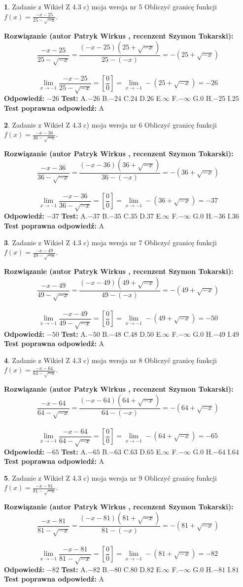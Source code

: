 \documentclass[12pt, a4paper]{article}
\theoremstyle{definition} %
\newtheorem{zad}{}
\newcommand{\zadStart}[1]{\begin{zad}#1\newline}
\newcommand{\zadStop}{\end{zad}}
\newcommand{\rozwStart}[2]{\noindent \textbf{Rozwiązanie (autor #1 , recenzent #2): }\newline}
\newcommand{\rozwStop}{\newline}
\newcommand{\odpStart}{\noindent \textbf{Odpowiedź:}\newline}
\newcommand{\odpStop}{\newline}
\newcommand{\testStart}{\noindent \textbf{Test:}\newline}
\newcommand{\testStop}{\newline}
\newcommand{\kluczStart}{\noindent \textbf{Test poprawna odpowiedź:}\newline}
\newcommand{\kluczStop}{\newline}
\begin{document}
\zadStart{Zadanie z Wikieł Z 4.3 c) moja wersja nr 5}
Obliczyć granicę funkcji $f(x)=\frac{-x-25}{25-\sqrt{-x}}$.
\zadStop
\rozwStart{Patryk Wirkus}{Szymon Tokarski}
$$\frac{-x-25}{25-\sqrt{-x}}=\frac{(-x-25)(25+\sqrt{-x})}{25-(-x)}=-(25+\sqrt{-x})$$
\\
$$\lim\limits_{x\to-1}\frac{-x-25}{25-\sqrt{-x}}=[\frac{0}{0}]=\lim\limits_{x\to-1}-(25+\sqrt{-x}) =-26$$
\rozwStop
\odpStart
$-26$
\odpStop
\testStart
A.$-26$
B.$-24$
C.$24$
D.$26$
E.$\infty$
F.$-\infty$
G.$0$
H.$-25$
I.$25$
\testStop
\kluczStart
A
\kluczStop



\zadStart{Zadanie z Wikieł Z 4.3 c) moja wersja nr 6}
Obliczyć granicę funkcji $f(x)=\frac{-x-36}{36-\sqrt{-x}}$.
\zadStop
\rozwStart{Patryk Wirkus}{Szymon Tokarski}
$$\frac{-x-36}{36-\sqrt{-x}}=\frac{(-x-36)(36+\sqrt{-x})}{36-(-x)}=-(36+\sqrt{-x})$$
\\
$$\lim\limits_{x\to-1}\frac{-x-36}{36-\sqrt{-x}}=[\frac{0}{0}]=\lim\limits_{x\to-1}-(36+\sqrt{-x}) =-37$$
\rozwStop
\odpStart
$-37$
\odpStop
\testStart
A.$-37$
B.$-35$
C.$35$
D.$37$
E.$\infty$
F.$-\infty$
G.$0$
H.$-36$
I.$36$
\testStop
\kluczStart
A
\kluczStop



\zadStart{Zadanie z Wikieł Z 4.3 c) moja wersja nr 7}
Obliczyć granicę funkcji $f(x)=\frac{-x-49}{49-\sqrt{-x}}$.
\zadStop
\rozwStart{Patryk Wirkus}{Szymon Tokarski}
$$\frac{-x-49}{49-\sqrt{-x}}=\frac{(-x-49)(49+\sqrt{-x})}{49-(-x)}=-(49+\sqrt{-x})$$
\\
$$\lim\limits_{x\to-1}\frac{-x-49}{49-\sqrt{-x}}=[\frac{0}{0}]=\lim\limits_{x\to-1}-(49+\sqrt{-x}) =-50$$
\rozwStop
\odpStart
$-50$
\odpStop
\testStart
A.$-50$
B.$-48$
C.$48$
D.$50$
E.$\infty$
F.$-\infty$
G.$0$
H.$-49$
I.$49$
\testStop
\kluczStart
A
\kluczStop



\zadStart{Zadanie z Wikieł Z 4.3 c) moja wersja nr 8}
Obliczyć granicę funkcji $f(x)=\frac{-x-64}{64-\sqrt{-x}}$.
\zadStop
\rozwStart{Patryk Wirkus}{Szymon Tokarski}
$$\frac{-x-64}{64-\sqrt{-x}}=\frac{(-x-64)(64+\sqrt{-x})}{64-(-x)}=-(64+\sqrt{-x})$$
\\
$$\lim\limits_{x\to-1}\frac{-x-64}{64-\sqrt{-x}}=[\frac{0}{0}]=\lim\limits_{x\to-1}-(64+\sqrt{-x}) =-65$$
\rozwStop
\odpStart
$-65$
\odpStop
\testStart
A.$-65$
B.$-63$
C.$63$
D.$65$
E.$\infty$
F.$-\infty$
G.$0$
H.$-64$
I.$64$
\testStop
\kluczStart
A
\kluczStop



\zadStart{Zadanie z Wikieł Z 4.3 c) moja wersja nr 9}
Obliczyć granicę funkcji $f(x)=\frac{-x-81}{81-\sqrt{-x}}$.
\zadStop
\rozwStart{Patryk Wirkus}{Szymon Tokarski}
$$\frac{-x-81}{81-\sqrt{-x}}=\frac{(-x-81)(81+\sqrt{-x})}{81-(-x)}=-(81+\sqrt{-x})$$
\\
$$\lim\limits_{x\to-1}\frac{-x-81}{81-\sqrt{-x}}=[\frac{0}{0}]=\lim\limits_{x\to-1}-(81+\sqrt{-x}) =-82$$
\rozwStop
\odpStart
$-82$
\odpStop
\testStart
A.$-82$
B.$-80$
C.$80$
D.$82$
E.$\infty$
F.$-\infty$
G.$0$
H.$-81$
I.$81$
\testStop
\kluczStart
A
\kluczStop
\end{document}
